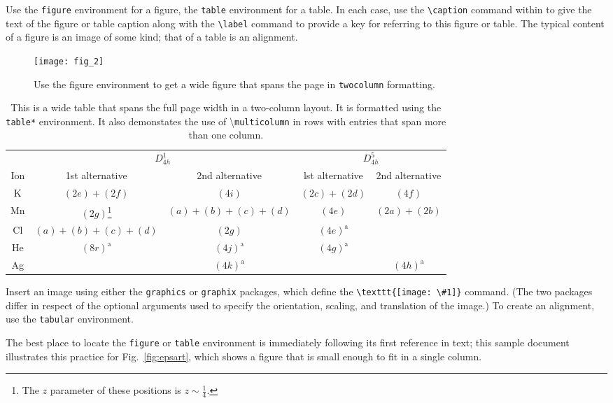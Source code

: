 \documentclass[%
 reprint,
 amsmath,amssymb,
 aps,
]{revtex4-2}
\begin{document}
Use the \texttt{figure} environment for a figure, the \texttt{table} environment for a table.
In each case, use the \verb+\caption+ command within to give the text of the
figure or table caption along with the \verb+\label+ command to provide
a key for referring to this figure or table.
The typical content of a figure is an image of some kind; 
that of a table is an alignment.%
\begin{figure}
\texttt{[image: fig\_2]}%
\caption{\label{fig:wide}Use the figure environment to get a wide
figure that spans the page in \texttt{twocolumn} formatting.}
\end{figure}

\begin{table}
\caption{\label{tab:table3}This is a wide table that spans the full page
width in a two-column layout. It is formatted using the
\texttt{table*} environment. It also demonstates the use of
\textbackslash\texttt{multicolumn} in rows with entries that span
more than one column.}
\begin{ruledtabular}
\begin{tabular}{ccccc}
 &\multicolumn{2}{c}{$D_{4h}^1$}&\multicolumn{2}{c}{$D_{4h}^5$}\\
 Ion&1st alternative&2nd alternative&lst alternative
&2nd alternative\\ \hline
 K&$(2e)+(2f)$&$(4i)$ &$(2c)+(2d)$&$(4f)$ \\
 Mn&$(2g)$\footnote{The $z$ parameter of these positions is $z\sim\frac{1}{4}$.}
 &$(a)+(b)+(c)+(d)$&$(4e)$&$(2a)+(2b)$\\
 Cl&$(a)+(b)+(c)+(d)$&$(2g)$\footnotemark[1]
 &$(4e)^{\text{a}}$\\
 He&$(8r)^{\text{a}}$&$(4j)^{\text{a}}$&$(4g)^{\text{a}}$\\
 Ag& &$(4k)^{\text{a}}$& &$(4h)^{\text{a}}$\\
\end{tabular}
\end{ruledtabular}
\end{table}

Insert an image using either the \texttt{graphics} or
\texttt{graphix} packages, which define the \verb+\texttt{[image: \#1]}+ command.
(The two packages differ in respect of the optional arguments 
used to specify the orientation, scaling, and translation of the image.) 
To create an alignment, use the \texttt{tabular} environment. 

The best place to locate the \texttt{figure} or \texttt{table} environment
is immediately following its first reference in text; this sample document
illustrates this practice for Fig.~\ref{fig:epsart}, which
shows a figure that is small enough to fit in a single column. 
\end{document}
